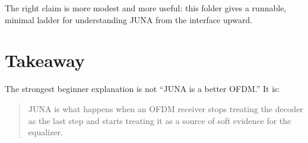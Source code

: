 \documentclass[11pt]{article}
\newcommand{\juna}{JUNA}
\begin{document}
The right claim is more modest and more useful: this folder gives a runnable,
minimal ladder for understanding \juna{} from the interface upward.

\section{Takeaway}

The strongest beginner explanation is not ``\juna{} is a better OFDM.'' It is:

\begin{quote}
\juna{} is what happens when an OFDM receiver stops treating the decoder as the
last step and starts treating it as a source of soft evidence for the equalizer.
\end{quote}
\end{document}
